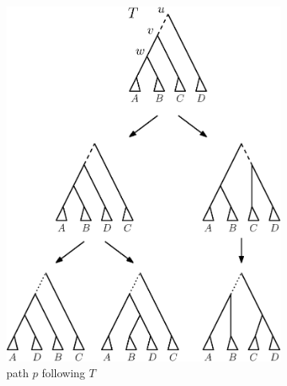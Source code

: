 \documentclass{amsart}
\begin{document}
\begin{enumerate}
    \begin{figure}[H]
        \begin{subfigure}[b]{.45\textwidth}
            \centering
            \includegraphics[width=0.9\linewidth]{thm_fp_nni2a.eps}
            \vspace{12pt}
            \caption{path $p$ following $T$}
            \label{fig:thm_fp_nni2a}
        \end{subfigure}
        \begin{subfigure}[b]{.45\textwidth}
            \centering

\end{subfigure}
\end{figure}
\end{enumerate}
\end{document}
